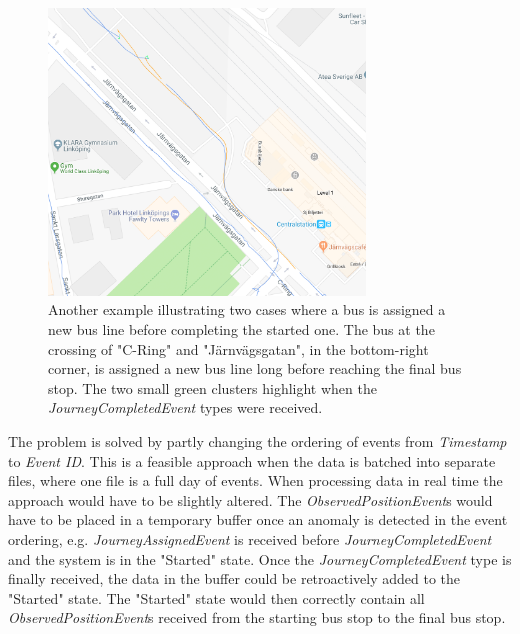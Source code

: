 \begin{figure}[t!]
    \centering
    \includegraphics[width=0.75\textwidth]{figures/assigned_completed_problem}
    \caption{Another example illustrating two cases where a bus is assigned a new bus line before completing the started one.
    The bus at the crossing of "C-Ring" and "Järnvägsgatan", in the bottom-right corner, is assigned a new bus line long before reaching the final bus stop.
    The two small green clusters highlight when the \textit{JourneyCompletedEvent} types were received.}
    \label{fig:assigned-before-completed}
\end{figure}

The problem is solved by partly changing the ordering of events from \textit{Timestamp} to \textit{Event ID}.
This is a feasible approach when the data is batched into separate files, where one file is a full day of events.
When processing data in real time the approach would have to be slightly altered.
The \textit{ObservedPositionEvent}s would have to be placed in a temporary buffer once an anomaly is detected in the event ordering, e.g. \textit{JourneyAssignedEvent} is received before \textit{JourneyCompletedEvent} and the system is in the "Started" state.
Once the \textit{JourneyCompletedEvent} type is finally received, the data in the buffer could be retroactively added to the "Started" state.
The "Started" state would then correctly contain all \textit{ObservedPositionEvent}s received from the starting bus stop to the final bus stop.


